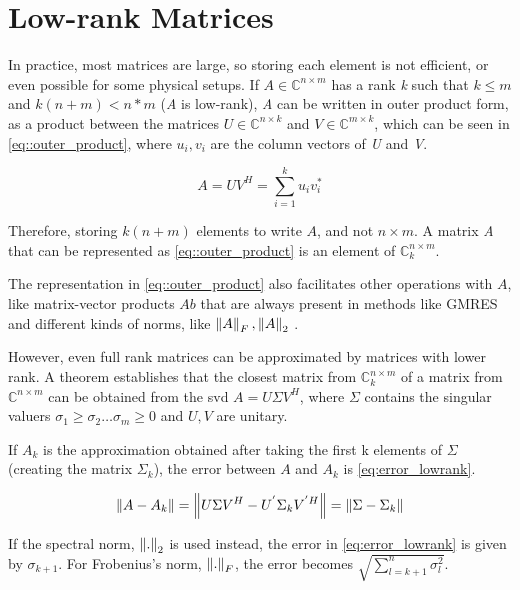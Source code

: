 \section{Low-rank Matrices}

In practice, most matrices are large, so storing each element is not efficient, or even possible for some physical setups. If $A \in \mathbb{C}^{n\times m}$ has a rank \textit{k} such that $k \leq m$ and $k(n+m) < n*m$ (\textit{A} is low-rank), \textit{A} can be written in outer product form, as a product between the matrices $U \in \mathbb{C}^{n\times k} $ and $V \in \mathbb{C}^{m\times k}$, which can be seen in \ref{eq::outer_product}, where $u_{i}, v_{i}$ are the column vectors of \textit{U} and \textit{V}.

\begin{equation}\label{eq::outer_product}
    A = UV^{H} = \sum_{i=1} ^{k} u_{i} v_{i} ^{*}
\end{equation}


Therefore, storing $k(n+m)$ elements to write $A$, and not $n\times m$. A matrix \textit{A} that can be represented as \ref{eq::outer_product} is an element of $\mathbb{C}^{n\times m}_{k}$.

The representation in \ref{eq::outer_product} also facilitates other operations with $A$, like matrix-vector products $Ab$ that are always present in methods like GMRES \cite{bebendorf2008hierarchical} and different kinds of norms, like $\left\lVert A\right\rVert_{F}, \left\lVert A\right\rVert_{2}$ \cite{bebendorf2008hierarchical}.


However, even full rank matrices can be approximated by matrices with lower rank. A theorem \cite{bebendorf2008hierarchical} establishes that the closest matrix from $\mathbb{C}^{n\times m}_{k}$ of a matrix from $\mathbb{C}^{n\times m}$ can be obtained from the  \acrshort{svd} $A = U \Sigma V^{H}$, where $\Sigma$ contains the singular valuers $\sigma_{1} \geq \sigma_{2} \dots \sigma_{m} \geq 0$ and $U,V$ are unitary.

If $ A_{k} $ is the approximation obtained after taking the first k elements of $\Sigma$ (creating the matrix $ \Sigma_{k} $), the error between $ A $ and $ A_{k} $ is \ref{eq:error_lowrank}.

\begin{equation}\label{eq:error_lowrank}
    \left\lVert A-A_{k}\right\rVert = \left\lVert U\Sigma V^{H} - U^{'} \Sigma_{k} V^{' H}\right\rVert = \left\lVert\Sigma - \Sigma_{k}\right\rVert
\end{equation}

If the spectral norm, $\left\lVert.\right\rVert_{2} $ is used instead, the error in \ref{eq:error_lowrank} is given by $\sigma_{k+1}$. For Frobenius's norm, $\left\lVert.\right\rVert_{F}$, the error becomes $\sqrt{\sum^{n}_{l=k+1} \sigma^{2}_{l}}$.

